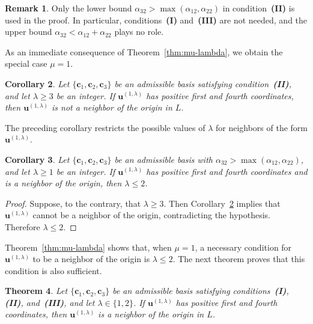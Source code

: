 \documentclass[12pt,a4paper]{amsart}
\newtheorem{theorem}{Theorem}[section]
\newtheorem{corollary}[theorem]{Corollary}
\theoremstyle{definition}
\newtheorem{remark}[theorem]{Remark}
\begin{document}
\begin{remark}
Only the lower bound $\alpha_{32}>\max(\alpha_{12},\alpha_{22})$ in
condition~\textup{\textbf{(II)}} is used in the proof. In particular,
conditions~\textup{\textbf{(I)}} and~\textup{\textbf{(III)}} are not
needed, and the upper bound $\alpha_{32}<\alpha_{12}+\alpha_{22}$
plays no role.
\end{remark}

As an immediate consequence of
Theorem~\ref{thm:mu-lambda}, we obtain the special case $\mu=1$.

\begin{corollary}\label{cor:lambda-general}
Let $\{\mathbf c_1,\mathbf c_2,\mathbf c_3\}$ be an admissible basis
satisfying condition~\textup{\textbf{(II)}}, and let $\lambda\ge3$
be an integer.
If $\mathbf u^{(1,\lambda)}$ has positive first and fourth coordinates,
then $\mathbf u^{(1,\lambda)}$ is not a neighbor of the origin in $L$.
\end{corollary}

The preceding corollary restricts the possible values of $\lambda$ for
neighbors of the form $\mathbf u^{(1,\lambda)}$.

\begin{corollary}\label{cor:lambda}
Let $\{\mathbf c_1,\mathbf c_2,\mathbf c_3\}$ be an admissible basis
with $\alpha_{32}>\max(\alpha_{12},\alpha_{22})$, and let
$\lambda\ge1$ be an integer.
If $\mathbf u^{(1,\lambda)}$ has positive first and fourth coordinates
and is a neighbor of the origin, then $\lambda\le2$.
\end{corollary}

\begin{proof}
Suppose, to the contrary, that $\lambda\ge3$.
Then Corollary~\ref{cor:lambda-general} implies that
$\mathbf u^{(1,\lambda)}$ cannot be a neighbor of the origin,
contradicting the hypothesis.
Therefore $\lambda\le2$.
\end{proof}

Theorem~\ref{thm:mu-lambda} shows that, when $\mu=1$, a necessary
condition for $\mathbf u^{(1,\lambda)}$ to be a neighbor of the origin
is $\lambda\le2$. The next theorem proves that this condition is also
sufficient.

\begin{theorem}\label{thm:converse}
Let $\{\mathbf c_1,\mathbf c_2,\mathbf c_3\}$ be an admissible basis
satisfying conditions~\textup{\textbf{(I)}},
\textup{\textbf{(II)}}, and~\textup{\textbf{(III)}},
and let $\lambda\in\{1,2\}$.
If $\mathbf u^{(1,\lambda)}$ has positive first and fourth
coordinates, then $\mathbf u^{(1,\lambda)}$ is a neighbor of the
origin in $L$.
\end{theorem}
\end{document}

